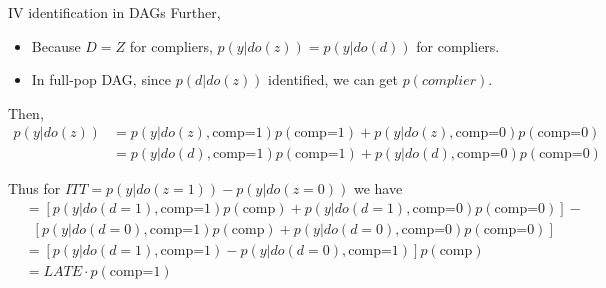 \documentclass[xcolor=dvipsnames]{beamer}
\begin{document}
\begin{frame}{IV identification in DAGs}
\small
{} Further, \\
\small
\begin{itemize}
\item Because $D=Z$ for compliers,  $p(y|do(z))=p(y|do(d))$ for compliers.
\item In full-pop DAG, since $p(d|do(z))$ identified, we can get $p(complier)$.
\end{itemize}

  Then,
\footnotesize
\begin{align*}
p(y|do(z)) &=  p(y|do(z), \text{comp=1})p(\text{comp=1}) + p(y|do(z), \text{comp=0})p(\text{comp=0}) \\
&= p(y|do(d), \text{comp=1})p(\text{comp=1})  +  p(y| do(d), \text{comp=0})p(\text{comp=0})
\end{align*}

\small
{} Thus for $ ITT= p(y|do(z=1))-p(y|do(z=0)) $ we have
\footnotesize
\begin{align*}
&= [p(y|do(d=1), \text{comp=1})p(\text{comp})  +  p(y| do(d=1), \text{comp=0})p(\text{comp=0})] - \\
& \;\; [p(y|do(d=0), \text{comp=1})p(\text{comp})  +  p(y| do(d=0), \text{comp=0})p(\text{comp=0})] \\
&= [p(y|do(d=1), \text{comp=1}) - p(y|do(d=0), \text{comp=1})]p(\text{comp})  \\
 &= LATE \cdot p(\text{comp=1}) 
\end{align*}
\end{frame}
\end{document}
